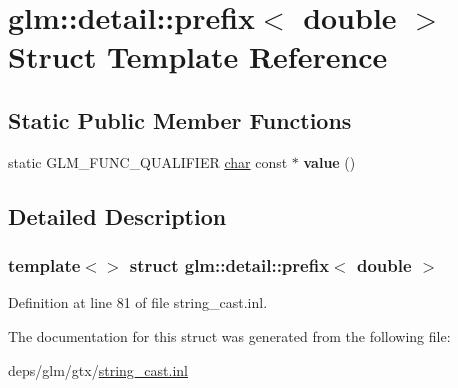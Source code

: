 \hypertarget{structglm_1_1detail_1_1prefix_3_01double_01_4}{}\section{glm\+:\+:detail\+:\+:prefix$<$ double $>$ Struct Template Reference}
\label{structglm_1_1detail_1_1prefix_3_01double_01_4}
\subsection*{Static Public Member Functions}
\begin{DoxyCompactItemize}
\item 
\mbox{\label{structglm_1_1detail_1_1prefix_3_01double_01_4_a39aa4646d7de33a2382c92db849d6eb5}} 
static G\+L\+M\+\_\+\+F\+U\+N\+C\+\_\+\+Q\+U\+A\+L\+I\+F\+I\+ER \hyperlink{classchar}{char} const  $\ast$ {\bfseries value} ()
\end{DoxyCompactItemize}


\subsection{Detailed Description}
\subsubsection*{template$<$$>$\newline
struct glm\+::detail\+::prefix$<$ double $>$}



Definition at line 81 of file string\+\_\+cast.\+inl.



The documentation for this struct was generated from the following file\+:\begin{DoxyCompactItemize}
\item 
deps/glm/gtx/\hyperlink{string__cast_8inl}{string\+\_\+cast.\+inl}\end{DoxyCompactItemize}
